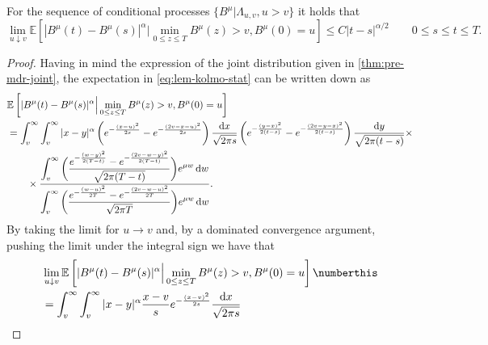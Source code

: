 \begin{lemma}\label{lem:tight-cond-kolmo}
	For the sequence of conditional processes $ \{ B^\mu | \Lambda_{u,v} , u >v \} $ it holds that
	\begin{equation}\label{eq:lem-kolmo-stat}
	\lim_{ u \downarrow v}
	\mathbb E \left [ |B^\mu(t) - B^\mu(s)|^\alpha \Big| \min_{ 0 \leq z \leq T } B^\mu(z) > v , B^\mu(0)  = u \right]  \leq C |t-s|^{\alpha/2} \qquad  0 \leq s \leq t \leq T.
	\end{equation}
	\begin{proof}
		Having in mind the expression of the joint distribution given in \autoref{thm:pre-mdr-joint}, 
		the expectation in \eqref{eq:lem-kolmo-stat} can be written down as 
		\begin{align*}
			&\mathbb E \left [ |B^\mu(t) - B^\mu(s)|^\alpha \Big| \min_{ 0 \leq z \leq T } B^\mu(z) > v , B^\mu(0)  = u \right] 
			\\
			&= 
			\int_v^\infty \int_v^\infty |x-y|^\alpha 
			\left( 
				e^{- \frac{ (x - u )^2}{2s } } 
				 -
				e^{- \frac{ (2v - x - u )^2}{2s } } 
			\right)		
			\frac{ \mathrm d x}{	\sqrt{2\pi s } }  
			\left( 
			e^{- \frac{ (y - x )^2}{2(t-s) } } 
			-
			e^{- \frac{ (2v - y - x )^2}{2(t-s) } } 
			\right)		
			\frac{ \mathrm d y}{	\sqrt{2\pi (t-s) } }  \times 
			\\
			& \qquad \times 
			\frac{ 
				\displaystyle
				\int_v^\infty 
				\bigg( 
				\frac{ 
					e^{- \frac{ (w - y )^2}{2 (T - t) } } - 
					e^{- \frac{ (2v - w - y )^2}{2 (T - t) } } 
				} 
				{ 
					\sqrt{2\pi (T - t) }
				} 
				\bigg)  e^{\mu w} \,\mathrm d w 
			}{
				\displaystyle
				\int_v^\infty 
				\bigg(
				\frac{ 
					e^{- \frac{ (w - u )^2}{2T } } - 
					e^{- \frac{ (2v - w - u )^2}{2 T } } 
				}{
					\sqrt{2\pi T} 
				}
				\bigg)  e^{\mu w} \,\mathrm d w  
			}  .
		\end{align*}
		By taking the limit for $ u\to v  $ and,  by a dominated convergence argument, pushing the limit under the integral sign
		we have that 
		\begin{align*}
		&
		\lim_{ u \downarrow v}
		\mathbb E \left [ |B^\mu(t) - B^\mu(s)|^\alpha \Big| \min_{ 0 \leq z \leq T } B^\mu(z) > v , B^\mu(0)  = u \right]
		\numberthis 
		\\
		&= 
		\int_v^\infty \int_v^\infty |x-y|^\alpha 
		\frac{x-v}{s} 
		e^{- \frac{ (x - v )^2}{2s } } 
		\frac{ \mathrm d x}{	\sqrt{2\pi s } }  

\end{align*}
\end{proof}
\end{lemma}
